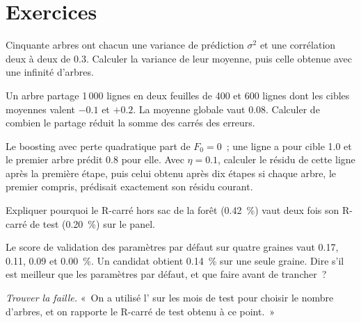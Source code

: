 \section{Exercices}

\begin{exercise}[$\star$]\label{exo:ml:trees-and-boosting:1}
Cinquante arbres ont chacun une variance de prédiction $\sigma^2$ et une corrélation deux à deux de 0.3. Calculer la variance de leur
moyenne, puis celle obtenue avec une infinité d'arbres.
\end{exercise}

\begin{exercise}[$\star$]\label{exo:ml:trees-and-boosting:2}
Un arbre partage 1\,000 lignes en deux feuilles de 400 et 600 lignes dont les cibles moyennes valent $-0.1$ et $+0.2$. La
moyenne globale vaut $0.08$. Calculer de combien le partage réduit la somme des carrés des erreurs.
\end{exercise}

\begin{exercise}[$\star$]\label{exo:ml:trees-and-boosting:3}
Le boosting avec perte quadratique part de $F_0 = 0$~; une ligne a pour cible 1.0 et le premier arbre prédit 0.8 pour elle. Avec
$\eta = 0.1$, calculer le résidu de cette ligne après la première étape, puis celui obtenu après dix étapes si chaque arbre, le premier
compris, prédisait exactement son résidu courant.
\end{exercise}

\begin{exercise}[$\star\star$]\label{exo:ml:trees-and-boosting:4}
Expliquer pourquoi le R-carré hors sac de la forêt (0.42~\%) vaut deux fois son R-carré de test (0.20~\%) sur le panel.
\end{exercise}

\begin{exercise}[$\star\star$]\label{exo:ml:trees-and-boosting:5}
Le score de validation des paramètres par défaut sur quatre graines vaut 0.17, 0.11, 0.09 et 0.00~\%. Un candidat obtient 0.14~\% sur une seule graine.
Dire s'il est meilleur que les paramètres par défaut, et que faire avant de trancher~?
\end{exercise}

\begin{exercise}[$\star\star$]\label{exo:ml:trees-and-boosting:6}
\emph{Trouver la faille.} «~On a utilisé l' sur les mois de test pour choisir le nombre d'arbres, et on rapporte le
R-carré de test obtenu à ce point.~»
\end{exercise}

